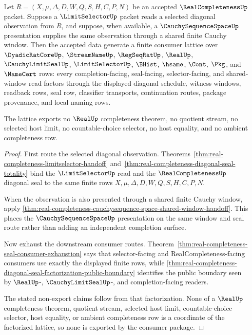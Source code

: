 \begin{theorem}
\label{thm:real-completeness-diagonal-example-consumer-lattice}
Let $R=(X,\mu,\Delta,D,W,Q,S,H,C,P,N)$ be an accepted $\RealCompletenessUp$ packet. Suppose a $\LimitSelectorUp$ packet reads a selected diagonal observation from $R$, and suppose, when available, a $\CauchySequenceSpaceUp$ presentation supplies the same observation through a shared finite Cauchy window. Then the accepted data generate a finite consumer lattice over $\DyadicRatCoreUp$, $\StreamNameUp$, $\RegSeqRatUp$, $\RealUp$, $\CauchyLimitSealUp$, $\LimitSelectorUp$, $\BHist$, $\hsame$, $\Cont$, $\Pkg$, and $\NameCert$ rows: every completion-facing, seal-facing, selector-facing, and shared-window read factors through the displayed diagonal schedule, witness windows, readback rows, seal row, classifier transports, continuation routes, package provenance, and local naming rows.

The lattice exports no $\RealUp$ completeness theorem, no quotient stream, no selected host limit, no countable-choice selector, no host equality, and no ambient completeness row.
\end{theorem}
\begin{proof}
First route the selected diagonal observation. Theorems~\ref{thm:real-completeness-limitselector-handoff} and~\ref{thm:real-completeness-diagonal-seal-totality} bind the $\LimitSelectorUp$ read and the $\RealCompletenessUp$ diagonal seal to the same finite rows $X,\mu,\Delta,D,W,Q,S,H,C,P,N$.

When the observation is also presented through a shared finite Cauchy window, apply \autoref{thm:real-completeness-cauchysequence-space-shared-window-handoff}. This places the $\CauchySequenceSpaceUp$ presentation on the same window and seal route rather than adding an independent completion surface.

Now exhaust the downstream consumer routes. Theorem~\ref{thm:real-completeness-seal-consumer-exhaustion} says that selector-facing and RealCompleteness-facing consumers use exactly the displayed finite rows, while \autoref{thm:real-completeness-diagonal-seal-factorization-public-boundary} identifies the public boundary seen by $\RealUp$-, $\CauchyLimitSealUp$-, and completion-facing readers.

The stated non-export claims follow from that factorization. None of a $\RealUp$ completeness theorem, quotient stream, selected host limit, countable-choice selector, host equality, or ambient completeness row is a coordinate of the factorized lattice, so none is exported by the consumer package.
\end{proof}

